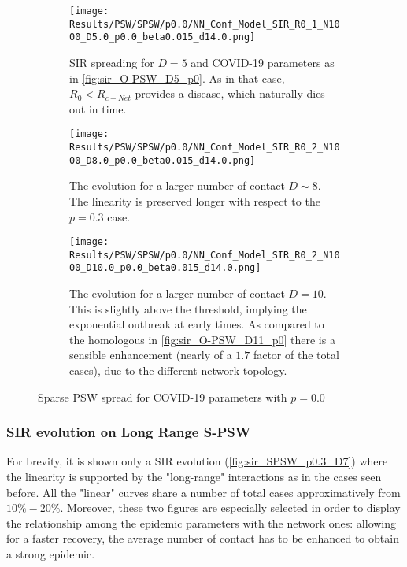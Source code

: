 \documentclass[a4paper,10pt,twoside]{book} %
\theoremstyle{definition}
\begin{document}
\begin{figure}[p]
	\centering
	\begin{subfigure}{\linewidth}
		\centering
		\texttt{[image: Results/PSW/SPSW/p0.0/NN\_Conf\_Model\_SIR\_R0\_1\_N1000\_D5.0\_p0.0\_beta0.015\_d14.0.png]}
		\caption{SIR spreading for $D = 5$ and COVID-19 parameters as in \autoref{fig:sir_O-PSW_D5_p0}. As in that case, $R_0 < R_{c-Net}$ provides a disease, which naturally dies out in time.}
		\label{fig:sir_S-PSW_D5_p0.0}
	\end{subfigure}
	\vfill	
	\begin{subfigure}{\linewidth}
		\centering
		\texttt{[image: Results/PSW/SPSW/p0.0/NN\_Conf\_Model\_SIR\_R0\_2\_N1000\_D8.0\_p0.0\_beta0.015\_d14.0.png]}
		\caption{The evolution for a larger number of contact $D \sim 8$. The linearity is preserved longer with respect to the $p = 0.3$ case.}
		\label{fig:sir_S-PSW_D8_p0.0}
	\end{subfigure}
	\vfill
	\begin{subfigure}{\linewidth}
		\centering
		\texttt{[image: Results/PSW/SPSW/p0.0/NN\_Conf\_Model\_SIR\_R0\_2\_N1000\_D10.0\_p0.0\_beta0.015\_d14.0.png]}
		\caption{The evolution for a larger number of contact $D = 10$. This is slightly above the threshold, implying the exponential outbreak at early times. As compared to the homologous in \autoref{fig:sir_O-PSW_D11_p0} there is a sensible enhancement (nearly of a $1.7$ factor of the total cases), due to the different network topology.}
		\label{fig:sir_S-PSW_D10_p0.0}
	\end{subfigure}
	\caption{Sparse PSW spread for COVID-19 parameters with $p = 0.0$ }
	\label{fig:sir_SPSW_COVID}
\end{figure}

\newpage
\subsubsection*{SIR evolution on Long Range S-PSW}
For brevity, it is shown only a SIR evolution (\autoref{fig:sir_SPSW_p0.3_D7}) where the linearity is supported by the "long-range" interactions as in the cases seen before. All the "linear" curves share a number of total cases approximatively from $10\% - 20\%$. Moreover, these two figures are especially selected in order to display the relationship among the epidemic parameters with the network ones: allowing for a faster recovery, the average number of contact has to be enhanced to obtain a strong epidemic.
\end{document}

